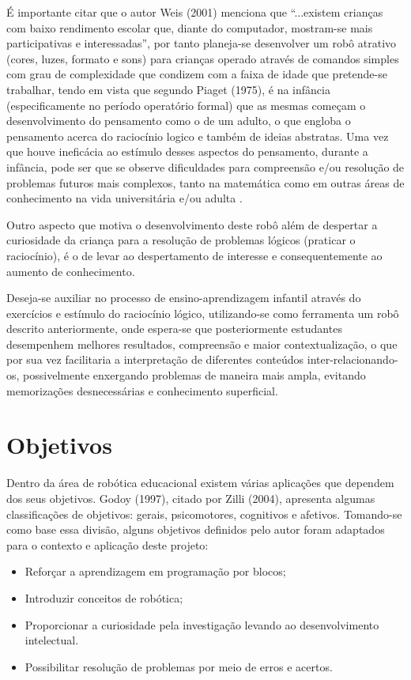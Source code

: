 É importante citar que o autor Weis (2001) menciona que “...existem crianças com baixo rendimento escolar que, diante do computador, mostram-se mais participativas e interessadas”, por tanto planeja-se desenvolver um robô atrativo (cores, luzes, formato e sons) para crianças operado através de comandos simples com grau de complexidade que condizem com a faixa de idade que pretende-se trabalhar, tendo em vista que segundo Piaget (1975), é na infância (especificamente no período operatório formal) que as mesmas começam o desenvolvimento do pensamento como o de um adulto, o que engloba o pensamento acerca do raciocínio logico e também de ideias abstratas. Uma vez que houve ineficácia ao estímulo desses aspectos do pensamento, durante a infância, pode ser que se observe dificuldades para compreensão e/ou resolução de problemas futuros mais complexos, tanto na matemática como em outras áreas de conhecimento na vida universitária e/ou adulta \cite{rauber:2003}.

Outro aspecto que motiva o desenvolvimento deste robô além de despertar a curiosidade da criança para a resolução de problemas lógicos (praticar o raciocínio), é o de levar ao despertamento de interesse e consequentemente ao aumento de conhecimento.

Deseja-se auxiliar no processo de ensino-aprendizagem infantil através do exercícios e estímulo do raciocínio lógico, utilizando-se como ferramenta um robô descrito anteriormente, onde espera-se que posteriormente estudantes desempenhem melhores resultados, compreensão e maior contextualização, o que por sua vez facilitaria a interpretação de diferentes conteúdos inter-relacionando-os, possivelmente enxergando problemas de maneira mais ampla, evitando memorizações desnecessárias e conhecimento superficial.

\section{Objetivos}
Dentro da área de robótica educacional existem várias aplicações que dependem dos seus objetivos. Godoy (1997), citado por Zilli (2004), apresenta algumas classificações de objetivos: gerais, psicomotores, cognitivos e afetivos. Tomando-se como base essa divisão, alguns objetivos definidos pelo autor foram adaptados para o contexto e aplicação deste projeto:
\begin{itemize}
	\item Reforçar a aprendizagem em programação por blocos;
	\item Introduzir conceitos de robótica;
	\item Proporcionar a curiosidade pela investigação levando ao desenvolvimento intelectual.
	\item Possibilitar resolução de problemas por meio de erros e acertos.
\end{itemize}

